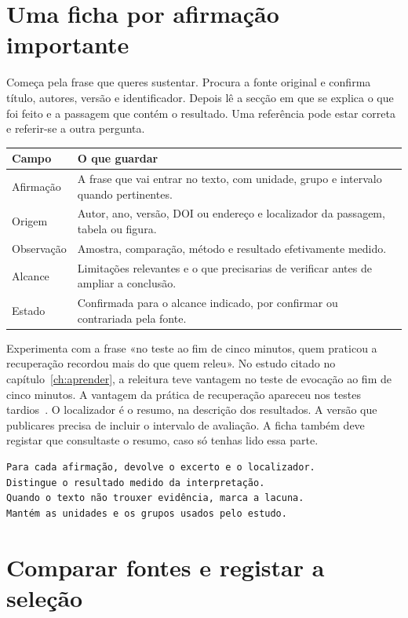 \section{Uma ficha por afirmação importante}

Começa pela frase que queres sustentar. Procura a fonte original e confirma título, autores, versão e identificador. Depois lê a secção em que se explica o que foi feito e a passagem que contém o resultado. Uma referência pode estar correta e referir-se a outra pergunta.

\begin{center}
\small
\begin{tabularx}{\textwidth}{@{}p{}X@{}}
\toprule
Campo & O que guardar \\
\midrule
Afirmação & A frase que vai entrar no texto, com unidade, grupo e intervalo quando pertinentes. \\
Origem & Autor, ano, versão, DOI ou endereço e localizador da passagem, tabela ou figura. \\
Observação & Amostra, comparação, método e resultado efetivamente medido. \\
Alcance & Limitações relevantes e o que precisarias de verificar antes de ampliar a conclusão. \\
Estado & Confirmada para o alcance indicado, por confirmar ou contrariada pela fonte. \\
\bottomrule
\end{tabularx}
\end{center}

Experimenta com a frase «no teste ao fim de cinco minutos, quem praticou a recuperação recordou mais do que quem releu». No estudo citado no capítulo~\ref{ch:aprender}, a releitura teve vantagem no teste de evocação ao fim de cinco minutos. A vantagem da prática de recuperação apareceu nos testes tardios~\citep{roedigerkarpicke2006}. O localizador é o resumo, na descrição dos resultados. A versão que publicares precisa de incluir o intervalo de avaliação. A ficha também deve registar que consultaste o resumo, caso só tenhas lido essa parte.

\begin{lstlisting}
Para cada afirmação, devolve o excerto e o localizador.
Distingue o resultado medido da interpretação.
Quando o texto não trouxer evidência, marca a lacuna.
Mantém as unidades e os grupos usados pelo estudo.
\end{lstlisting}

\section{Comparar fontes e registar a seleção}

